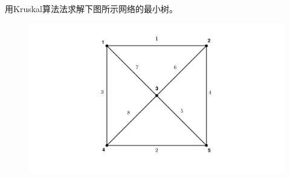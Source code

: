 \documentclass[lang = cn, scheme = chinese, thmcnt = section]{elegantbook}
\begin{document}
\begin{example}
	用Kruskal算法法求解下图所示网络的最小树。
	\begin{figure}[H]
		\centering
		\includegraphics[scale = 0.15]{../图/12.1.1}
	\end{figure}
\end{example}
\end{document}
